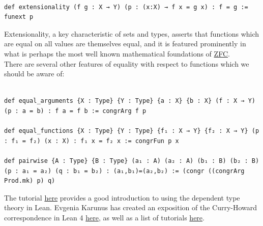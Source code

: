 \documentclass{book}
\newcounter{lcounter}
\begin{document}
\begin{center}
\begin{tcolorbox}[width=5in,colback={white},title={\begin{center}\texttt{Lean \thelcounter} \addtocounter{lcounter}{1}  \end{center}},colbacktitle=Blue,coltitle=black]
\begin{verbatim}

def extensionality (f g : X → Y) (p : (x:X) → f x = g x) : f = g := funext p

\end{verbatim}
\end{tcolorbox}
\end{center}

Extensionality, a key characteristic of sets and types, asserts that functions which are equal on all values are themselves equal, and it is featured prominently in what is perhaps the most well known mathematical foundations of \href{https://encyclopediaofmath.org/wiki/ZFC}{ZFC}.\\

There are several other features of equality with respect to functions which we should be aware of:

\begin{center}
\begin{tcolorbox}[width=5in,colback={white},title={\begin{center}\texttt{Lean \thelcounter} \addtocounter{lcounter}{1}  \end{center}},colbacktitle=Blue,coltitle=black]
\begin{verbatim}

def equal_arguments {X : Type} {Y : Type} {a : X} {b : X} (f : X → Y) (p : a = b) : f a = f b := congrArg f p

def equal_functions {X : Type} {Y : Type} {f₁ : X → Y} {f₂ : X → Y} (p : f₁ = f₂) (x : X) : f₁ x = f₂ x := congrFun p x

def pairwise {A : Type} {B : Type} (a₁ : A) (a₂ : A) (b₁ : B) (b₂ : B) (p : a₁ = a₂) (q : b₁ = b₂) : (a₁,b₁)=(a₂,b₂) := (congr ((congrArg Prod.mk) p) q)

\end{verbatim}
\end{tcolorbox}
\end{center}

The tutorial \href{https://leanprover.github.io/theorem_proving_in_lean4/}{here} provides a good introduction to using the dependent type theory in Lean. Evgenia Karunus has created an exposition of the Curry-Howard correspondence in Lean 4 \href{https://lakesare.brick.do/summary-of-curry-howard-correspondence-in-lean-jVegWWGN2JRD}{here}, as well as a list of tutorials \href{https://lakesare.brick.do/all-lean-books-and-where-to-find-them-x2nYwjM3AwBQ}{here}.\\
\end{document}
